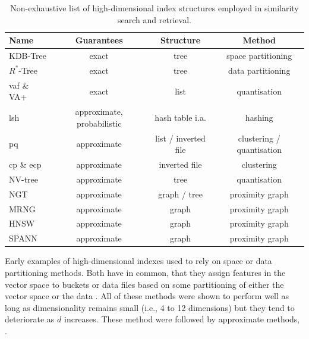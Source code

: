 \begin{table}
    \begin{tabular}{ | l | c | c | c |}
        \hline
        \textbf{Name} & \textbf{Guarantees} & \textbf{Structure} & \textbf{Method} \\
        \hline
        \hline
        KDB-Tree \cite{Robinson:1981KDB} & exact & tree & space partitioning \\  
        \hline
        $R^{*}$-Tree \cite{Beckmann:1990RTree} & exact & tree & data partitioning \\ 
        \hline
        \acrshort{vaf} \& VA+ \cite{Weber:1998Va,Ferhatosmanoglu:2000Vector} & exact & list & quantisation \\ 
        \hline
        \acrshort{lsh} \cite{Indyk1998:Approximate, Wang:2017ASurvey} & approximate, probabilistic & hash table i.a.  & hashing \\ 
        \hline
        \acrshort{pq} \cite{Jegou:2010Product} & approximate & list / inverted file & clustering / quantisation \\
        \hline 
        \acrshort{cp} \& e\acrshort{cp} \cite{Chierichetti:2007Finding,Gudmundsson:2010Large} & approximate & inverted file & clustering \\ 
        \hline
        NV-tree \cite{Lejsek:2009NVTree} & approximate & tree & quantisation \\ 
        \hline
        NGT \cite{Iwasaki2016:Pruned} & approximate & graph / tree & proximity graph \\ 
        \hline
        MRNG \cite{Lejsek:2009NVTree} & approximate & graph & proximity graph \\ 
        \hline
        HNSW \cite{Malkov:2018Efficient} & approximate & graph & proximity graph \\ 
        \hline
        SPANN \cite{Chen:2021SPANN} & approximate & graph & proximity graph \\ 
        \hline
    \end{tabular}
    \caption{Non-exhaustive list of high-dimensional index structures employed in similarity search and retrieval.}
    \label{table:index_structures}
\end{table}

Early examples of high-dimensional indexes used to rely on space or data partitioning methods. Both have in common, that they assign features in the vector space to buckets or data files based on some partitioning of either the vector space \cite{Bentley:1975Multidimensional,Robinson:1981KDB,Finkel:1974Quad} or the data \cite{Guttmann:1984RTrees,Beckmann:1990RTree,Ciaccia:1997Mtree}. All of these methods were shown to perform well as long as dimensionality remains small (i.e., 4 to 12 dimensions) but they tend to deteriorate as $d$ increases. These method were followed by approximate methods, \cite{Indyk1998:Approximate,Jegou:2010Product}.

